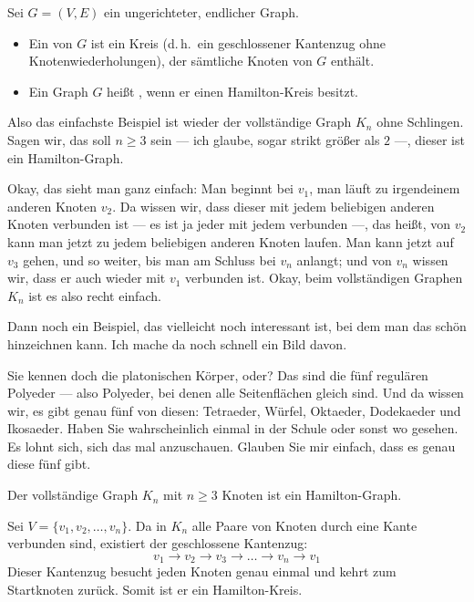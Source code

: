 \begin{math-stroke}
\begin{definition}\label{def:hamilton-kreis}
Sei $G = (V, E)$ ein ungerichteter, endlicher Graph.
\begin{itemize}
    \item Ein  von $G$ ist ein Kreis (d.\,h.\ ein geschlossener Kantenzug ohne Knotenwiederholungen), der sämtliche Knoten von $G$ enthält.
    \item Ein Graph $G$ heißt , wenn er einen Hamilton-Kreis besitzt.
\end{itemize}
\end{definition}
\end{math-stroke}

\begin{spoken-clean}[00:33:32 - 00:35:31]
Also das einfachste Beispiel ist wieder der vollständige Graph $K_n$ ohne Schlingen. Sagen wir, das soll $n \ge 3$ sein --- ich glaube, sogar strikt größer als $2$ ---, dieser ist ein Hamilton-Graph.

Okay, das sieht man ganz einfach: Man beginnt bei $v_1$, man läuft zu irgendeinem anderen Knoten $v_2$. Da wissen wir, dass dieser mit jedem beliebigen anderen Knoten verbunden ist --- es ist ja jeder mit jedem verbunden ---, das heißt, von $v_2$ kann man jetzt zu jedem beliebigen anderen Knoten laufen. Man kann jetzt auf $v_3$ gehen, und so weiter, bis man am Schluss bei $v_n$ anlangt; und von $v_n$ wissen wir, dass er auch wieder mit $v_1$ verbunden ist. Okay, beim vollständigen Graphen $K_n$ ist es also recht einfach.

Dann noch ein Beispiel, das vielleicht noch interessant ist, bei dem man das schön hinzeichnen kann. Ich mache da noch schnell ein Bild davon.

Sie kennen doch die platonischen Körper, oder? Das sind die fünf regulären Polyeder --- also Polyeder, bei denen alle Seitenflächen gleich sind. Und da wissen wir, es gibt genau fünf von diesen: Tetraeder, Würfel, Oktaeder, Dodekaeder und Ikosaeder. Haben Sie wahrscheinlich einmal in der Schule oder sonst wo gesehen. Es lohnt sich, sich das mal anzuschauen. Glauben Sie mir einfach, dass es genau diese fünf gibt.
\end{spoken-clean}

\begin{math-stroke}
\begin{example}\label{ex:kn-hamilton}
Der vollständige Graph $K_n$ mit $n \ge 3$ Knoten ist ein Hamilton-Graph.
\end{example}
\begin{short-proof}
Sei $V = \{v_1, v_2, \dots, v_n\}$. Da in $K_n$ alle Paare von Knoten durch eine Kante verbunden sind, existiert der geschlossene Kantenzug:
\[
v_1 \to v_2 \to v_3 \to \dots \to v_n \to v_1
\]
Dieser Kantenzug besucht jeden Knoten genau einmal und kehrt zum Startknoten zurück. Somit ist er ein Hamilton-Kreis.
\end{short-proof}
\end{math-stroke}

